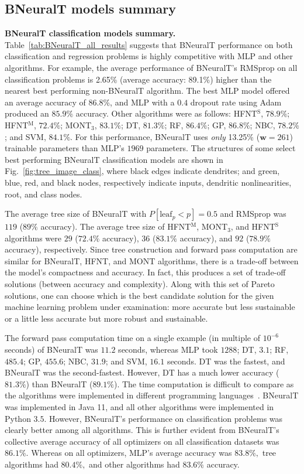 \documentclass[11pt,a4paper]{article}
\begin{document}
    \subsection{BNeuralT models summary}
    \textbf{BNeuralT classification models summary.}  
    Table~\ref{tab:BNeuralT_all_results} suggests that BNeuralT performance on both classification and regression problems is highly competitive with MLP and other algorithms. For example, the average performance of BNeuralT's RMSprop on all classification problems is 2.65\% (average accuracy: 89.1\%) higher than the nearest best performing non-BNeuralT algorithm. The best MLP model offered an average accuracy of 86.8\%, and MLP with a $0.4$ dropout rate using Adam produced an $85.9\%$ accuracy. Other algorithms were as follows: HFNT$^{\text{S}}$, $78.9\%$; HFNT$^{\text{M}}$, $72.4\%$; MONT$_3$, $83.1\%$; DT, $81.3\%$; RF, $86.4\%$; GP, $86.8\%$; NBC, $78.2\%$; and SVM, $84.1\%$. For this performance, BNeuralT uses \textit{only} 13.25\% ($\mathbf{w} = 261$) trainable parameters than MLP's $1969$ parameters. The structures of some select best performing BNeuralT classification models are shown in Fig.~\ref{fig:tree_image_class}, where black edges indicate dendrites; and  green, blue, red, and black nodes, respectively indicate inputs, dendritic nonlinearities, root, and class nodes.
    
    The average tree size of BNeuralT with $ P[\text{leaf}_{p} < p] = 0.5$ and RMSprop was $119$ ($89\%$ accuracy). The average tree size of HFNT$^{\text{M}}$, MONT$_3$, and HFNT$^{\text{S}}$ algorithms were $29$ ($72.4\%$ accuracy), $36$ ($83.1\%$ accuracy), and $92$ ($78.9\%$ accuracy), respectively. Since tree construction and forward pass computation are similar for BNeuralT, HFNT, and MONT algorithms, there is a trade-off between the model's compactness and accuracy. In fact, this produces a set of trade-off solutions (between accuracy and complexity). Along with this set of Pareto solutions, one can choose which is the best candidate solution for the given machine learning problem under examination: more accurate but less sustainable or a little less accurate but more robust and sustainable.
    
    The forward pass computation time on a single example (in multiple of $10^{-6}$ seconds) of BNeuralT was $11.2$ seconds, whereas MLP took $1288$; DT, $3.1$; RF, $485.4$; GP, $455.6$; NBC, $31.9$; and SVM, $16.1$ seconds. DT was the fastest, and BNeuralT was the second-fastest. However, DT has a much lower accuracy ($81.3\%$) than BNeuralT ($89.1\%$). The time computation is difficult to compare as the algorithms were implemented in different programming languages~\citep{pereira2017energy}. BNeuralT was implemented in Java 11, and all other algorithms were implemented in Python $3.5.$ However, BNeuralT's performance on classification problems was clearly better among all algorithms. This is further evident from BNeuralT's collective average accuracy of all optimizers on all classification datasets was $86.1\%.$ Whereas on all optimizers, MLP's average accuracy was $83.8\%,$ tree algorithms had $80.4\%,$ and other algorithms had $83.6\%$ accuracy.
    
\end{document}
